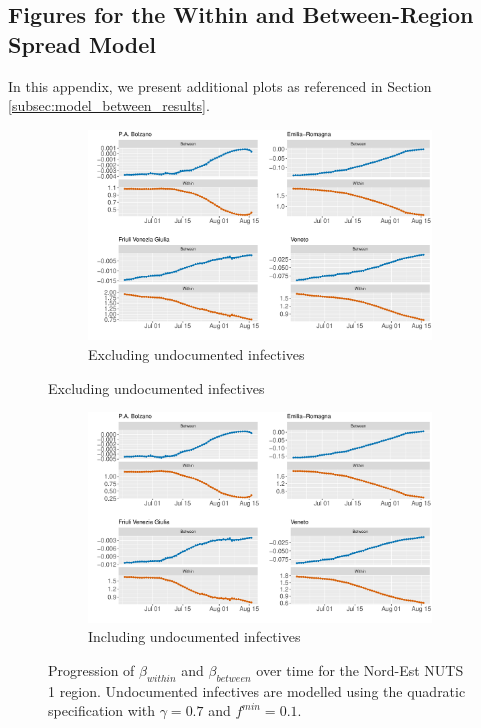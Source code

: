 \documentclass[12pt]{article}
\begin{document}
\begin{appendices}
		\subsection{Figures for the Within and Between-Region Spread Model} \label{sapp:model_between_figures}
		In this appendix, we present additional plots as referenced in Section \ref{subsec:model_between_results}.
		
		\begin{figure}[H]
    	    \centering
    	    \begin{subfigure}{\textwidth}
    	      \centering
    	      \includegraphics[width=0.85\linewidth]{output/model_between_lag14_betas_Nord-Est_rolling.pdf}
    	      \caption{Excluding undocumented infectives}
    	      \label{fig:beta_between_over_time_nordest_regular}
    	    \end{subfigure}
        \end{figure}
        \begin{figure}[H]\ContinuedFloat
    	    \begin{subfigure}{\textwidth}
    	      \centering
    	      \includegraphics[width=0.85\linewidth]{output/model_between_lag14_betas_Nord-Est_UndocQuadratic_rolling.pdf}
    	      \caption{Including undocumented infectives}
    	      \label{fig:beta_between_over_time_nordest_regular_undoc}
    	    \end{subfigure}
    	    \caption{Progression of $\beta_{within}$ and $\beta_{between}$ over time for the Nord-Est NUTS 1 region. Undocumented infectives are modelled using the quadratic specification with $\gamma = 0.7$ and $f^{min}=0.1$.}
    	    \label{fig:beta_between_over_time_nordest}
        \end{figure}
		

\end{appendices}
\end{document}
